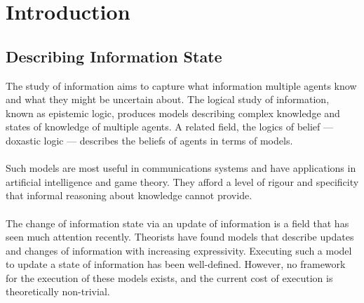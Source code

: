\documentclass[10pt, a4paper, twoside]{article}
\begin{document}

\tableofcontents

\vfill
\pagebreak


\section{Introduction}\label{intro}
\subsection{Describing Information State}\label{intro_infoState}
The study of information aims to capture what information multiple agents know
and what they might be uncertain about.
The logical study of information, known as epistemic logic, produces models
describing complex knowledge and states of knowledge of multiple agents.
A related field, the logics of belief --- doxastic logic --- describes the
beliefs of agents in terms of models.\\
\\
Such models are most useful in communications systems and have applications in
artificial intelligence and game theory.
They afford a level of rigour and specificity that informal reasoning about
knowledge cannot provide.\\
\\
The change of information state via an update of information is a field that has
seen much attention recently.
Theorists have found models that describe updates and changes of information with
increasing expressivity.
Executing such a model to update a state of information has been well-defined.
However, no framework for the execution of these models exists, and the current
cost of execution is theoretically non-trivial.
\end{document}

